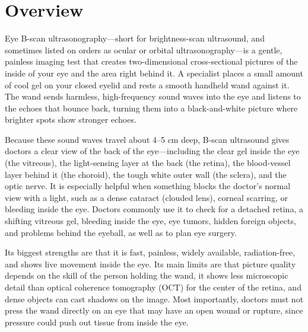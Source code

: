 \label{ch:infographic-bscan}

\section{Overview}

Eye B-scan ultrasonography---short for brightness-scan ultrasound, and sometimes listed on orders as ocular or orbital ultrasonography---is a gentle, painless imaging test that creates two-dimensional cross-sectional pictures of the inside of your eye and the area right behind it. A specialist places a small amount of cool gel on your closed eyelid and rests a smooth handheld wand against it. The wand sends harmless, high-frequency sound waves into the eye and listens to the echoes that bounce back, turning them into a black-and-white picture where brighter spots show stronger echoes.

Because these sound waves travel about 4--5 cm deep, B-scan ultrasound gives doctors a clear view of the back of the eye---including the clear gel inside the eye (the vitreous), the light-sensing layer at the back (the retina), the blood-vessel layer behind it (the choroid), the tough white outer wall (the sclera), and the optic nerve. It is especially helpful when something blocks the doctor's normal view with a light, such as a dense cataract (clouded lens), corneal scarring, or bleeding inside the eye. Doctors commonly use it to check for a detached retina, a shifting vitreous gel, bleeding inside the eye, eye tumors, hidden foreign objects, and problems behind the eyeball, as well as to plan eye surgery.

Its biggest strengths are that it is fast, painless, widely available, radiation-free, and shows live movement inside the eye. Its main limits are that picture quality depends on the skill of the person holding the wand, it shows less microscopic detail than optical coherence tomography (OCT) for the center of the retina, and dense objects can cast shadows on the image. Most importantly, doctors must not press the wand directly on an eye that may have an open wound or rupture, since pressure could push out tissue from inside the eye.


